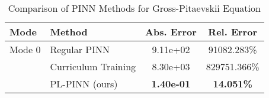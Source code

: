 \begin{table}[htbp]
\centering
\caption{Comparison of PINN Methods for Gross-Pitaevskii Equation}
\label{tab:pinn_comparison}
\begin{tabular}{llcc}
\toprule
Mode & Method & Abs. Error & Rel. Error \\
\midrule
Mode 0 & Regular PINN & 9.11e+02 & 91082.283\% \\
 & Curriculum Training & 8.30e+03 & 829751.366\% \\
 & PL-PINN (ours) & \textbf{1.40e-01} & \textbf{14.051\%} \\
\bottomrule
\end{tabular}
\end{table}